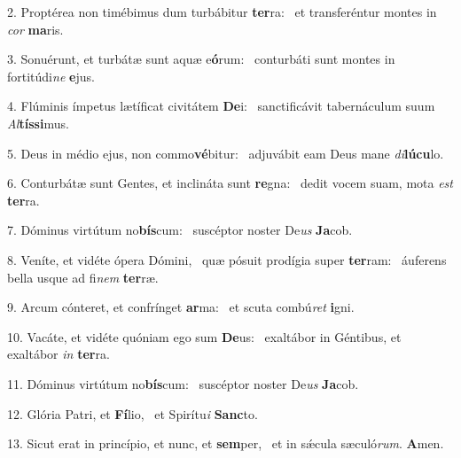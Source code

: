 2. Proptérea non timébimus dum turbábitur \textbf{ter}ra: \ast\  et transferéntur montes in \textit{cor} \textbf{ma}ris.\

3. Sonuérunt, et turbátæ sunt aquæ e\textbf{ó}rum: \ast\  conturbáti sunt montes in fortitúdi\textit{ne} \textbf{e}jus.\

4. Flúminis ímpetus lætíficat civitátem \textbf{De}i: \ast\  sanctificávit tabernáculum suum \textit{Al}\textbf{tís}\textbf{si}mus.\

5. Deus in médio ejus, non commo\textbf{vé}bitur: \ast\  adjuvábit eam Deus mane \textit{di}\textbf{lú}\textbf{cu}lo.\

6. Conturbátæ sunt Gentes, et inclináta sunt \textbf{re}gna: \ast\  dedit vocem suam, mota \textit{est} \textbf{ter}ra.\

7. Dóminus virtútum no\textbf{bís}cum: \ast\  suscéptor noster De\textit{us} \textbf{Ja}cob.\

8. Veníte, et vidéte ópera Dómini, \dag\  quæ pósuit prodígia super \textbf{ter}ram: \ast\  áuferens bella usque ad fi\textit{nem} \textbf{ter}ræ.\

9. Arcum cónteret, et confrínget \textbf{ar}ma: \ast\  et scuta combú\textit{ret} \textbf{i}gni.\

10. Vacáte, et vidéte quóniam ego sum \textbf{De}us: \ast\  exaltábor in Géntibus, et exaltábor \textit{in} \textbf{ter}ra.\

11. Dóminus virtútum no\textbf{bís}cum: \ast\  suscéptor noster De\textit{us} \textbf{Ja}cob.\

12. Glória Patri, et \textbf{Fí}lio, \ast\  et Spirítu\textit{i} \textbf{Sanc}to.\

13. Sicut erat in princípio, et nunc, et \textbf{sem}per, \ast\  et in sǽcula sæculó\textit{rum}. \textbf{A}men.\

